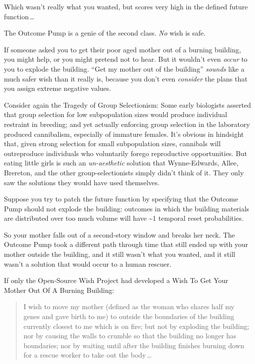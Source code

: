 {{
 Which wasn't really what you wanted, but scores
very high in the defined future function\,\ldots}

{
 The Outcome Pump is a genie of the second class. \textit{No} wish
is safe.}

{
 If someone asked you to get their poor aged mother out of a
burning building, you might help, or you might pretend not to hear. But
it wouldn't even \textit{occur} to you to explode the
building. ``Get my mother out of the
building'' \textit{sounds} like a much safer wish
than it really is, because you don't even
\textit{consider} the plans that you assign extreme negative values.}

{
 Consider again the Tragedy of Group Selectionism: Some early
biologists asserted that group selection for low subpopulation sizes
would produce individual restraint in breeding; and yet actually
enforcing group selection in the laboratory produced cannibalism,
especially of immature females. It's obvious in
hindsight that, given strong selection for small subpopulation sizes,
cannibals will outreproduce individuals who voluntarily forego
reproductive opportunities. But eating little girls is such an
\textit{un-aesthetic} solution that Wynne-Edwards, Allee, Brereton, and
the other group-selectionists simply didn't think of
it. They only saw the solutions they would have used themselves.}

{
 Suppose you try to patch the future function by specifying that
the Outcome Pump should not explode the building: outcomes in which the
building materials are distributed over too much volume will have \~{}1
temporal reset probabilities.}

{
 So your mother falls out of a second-story window and breaks her
neck. The Outcome Pump took a different path through time that still
ended up with your mother outside the building, and it still
wasn't what you wanted, and it still
wasn't a solution that would occur to a human rescuer.}

{
 If only the Open-Source Wish Project had developed a Wish To Get
Your Mother Out Of A Burning Building:}

\begin{quote}
{
 I wish to move my mother (defined as the woman who shares half my
genes and gave birth to me) to outside the boundaries of the building
currently closest to me which is on fire; but not by exploding the
building; nor by causing the walls to crumble so that the building no
longer has boundaries; nor by waiting until after the building finishes
burning down for a rescue worker to take out the body\,\ldots}
\end{quote}

}
